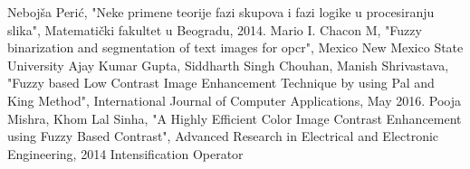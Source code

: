 \documentclass[12pt,a4paper]{article}
\theoremstyle{definition}
\theoremstyle{remark}
\theoremstyle{plain}
\begin{document}
\begin{thebibliography}{9}
  \bibitem{} Neboj\v sa Peri\' c, "Neke primene teorije fazi skupova i fazi logike u procesiranju slika", Matemati\v cki fakultet u Beogradu, 2014.
  \bibitem{} Mario I. Chacon M, "Fuzzy binarization and segmentation of text images for opcr", Mexico New Mexico State University
  \bibitem{} Ajay Kumar Gupta, Siddharth Singh Chouhan, Manish Shrivastava, "Fuzzy based Low Contrast Image Enhancement Technique by using Pal and King Method", International Journal of Computer Applications, May 2016.
  \bibitem{} Pooja Mishra, Khom Lal Sinha, "A Highly Efficient Color Image Contrast Enhancement using Fuzzy Based Contrast", Advanced Research in Electrical and Electronic Engineering, 2014
Intensification Operator

\end{thebibliography}
\end{document}
